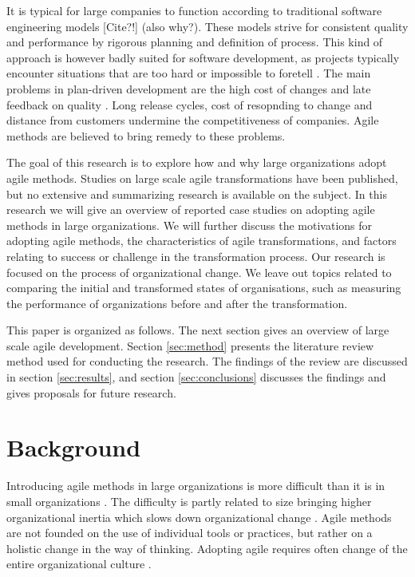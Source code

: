 \documentclass[lnbip]{svmultln}
\begin{document}
It is typical for large companies to function according to traditional software
engineering models [Cite?!] (also why?). These models strive for consistent quality and performance
by rigorous planning and definition of process. This kind of approach is however
badly suited for software development, as projects typically encounter
situations that are too hard or impossible to foretell .
The main problems in plan-driven development are the high cost of changes and
late feedback on quality . Long release cycles, cost of
resopnding to change and distance from customers undermine the  competitiveness
of companies. Agile methods are believed to bring remedy to these problems.

The goal of this research is to explore how and why large organizations adopt
agile methods. Studies on large scale agile transformations have been published,
but no extensive and summarizing research is available on the subject. In this
research we will give an overview of reported case studies on adopting agile
methods in large organizations. We will further discuss the motivations for
adopting agile methods, the characteristics of agile transformations, and
factors relating to success or challenge in the transformation process. Our
research is focused on the process of organizational change. We leave out topics
related to comparing the initial and transformed states of organisations, such
as measuring the performance of organizations before and after the
transformation.

This paper is organized as follows. The next section gives an overview of large
scale agile development. Section \ref{sec:method} presents the literature review
method used for conducting the research. The findings of the review are
discussed in section \ref{sec:results}, and section \ref{sec:conclusions}
discusses the findings and gives proposals for future research.


\section{Background}
\label{sec:background}

Introducing agile methods in large organizations is more difficult than it is in
small organizations . The difficulty is partly related to size
bringing higher organizational inertia which slows down organizational change
. Agile methods are not founded on the use of individual
tools or practices, but rather on a holistic change in the way of thinking.
Adopting agile requires often change of the entire organizational culture
.
\end{document}
